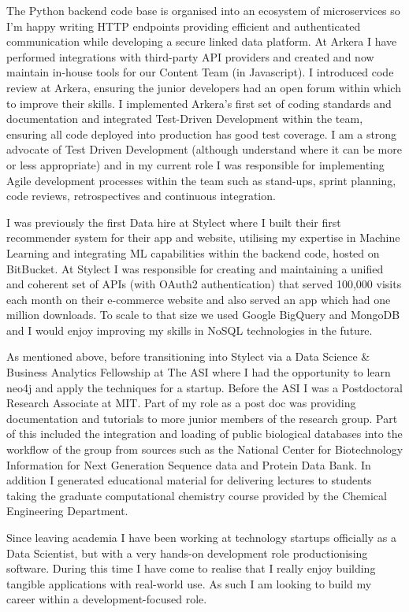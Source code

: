 \documentclass[11pt,a4paper,sans]{moderncv}        %
\begin{document}
The Python backend code base is organised into an ecosystem of microservices so I'm happy writing HTTP endpoints providing efficient and authenticated communication while developing a secure linked data platform. At Arkera I have performed integrations with third-party API providers and created and now maintain in-house tools for our Content Team (in Javascript). I introduced code review at Arkera, ensuring the junior developers had an open forum within which to improve their skills. I implemented Arkera's first set of coding standards and documentation and integrated Test-Driven Development within the team, ensuring all code deployed into production has good test coverage. I am a strong advocate of Test Driven Development (although understand where it can be more or less appropriate) and in my current role I was responsible for implementing Agile development processes within the team such as stand-ups, sprint planning, code reviews, retrospectives and continuous integration.

I was previously the first Data hire at Stylect where I built their first recommender system for their app and website, utilising my expertise in Machine Learning and integrating ML capabilities within the backend code, hosted on BitBucket. At Stylect I was responsible for creating and maintaining a unified and coherent set of APIs (with OAuth2 authentication) that served 100,000 visits each month on their e-commerce website and also served an app which had one million downloads. To scale to that size we used Google BigQuery and MongoDB and I would enjoy improving my skills in NoSQL technologies in the future.

As mentioned above, before transitioning into Stylect via a Data Science \& Business Analytics Fellowship at The ASI where I had the opportunity to learn neo4j and apply the techniques for a startup. Before the ASI I was a Postdoctoral Research Associate at MIT. Part of my role as a post doc was providing documentation and tutorials to more junior members of the research group.
Part of this included the integration and loading of public biological databases 
into the workflow of the group from sources such as the National Center for Biotechnology Information for Next Generation Sequence data and Protein Data Bank. In addition I generated educational material for delivering lectures to students taking the graduate computational chemistry course provided by the Chemical Engineering Department.  

Since leaving academia I have been working at technology startups officially as a Data Scientist, but with a very hands-on development role productionising software. During this time I have come to realise that I really enjoy building tangible applications with real-world use. As such I am looking to build my career within a development-focused role.
\end{document}
